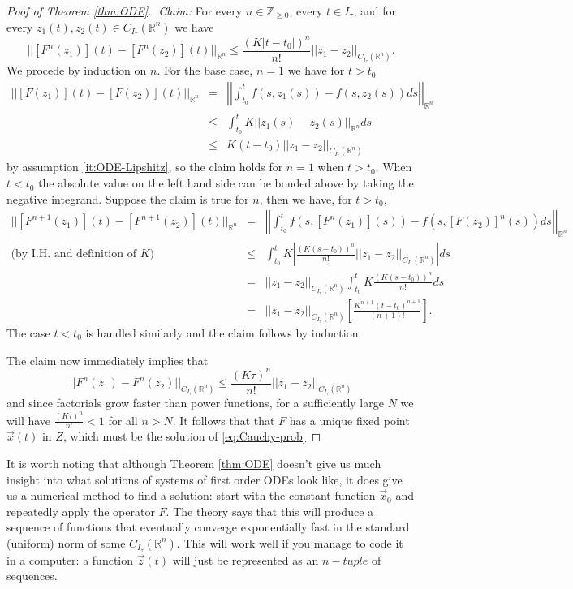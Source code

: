 \documentclass[10pt]{article}
\theoremstyle{definition}
\theoremstyle{remark}
\newcommand{\bbZ}{\mathbb{Z}}
\newcommand{\bbR}{\mathbb{R}}
\begin{document}
\begin{proof}[Poof of Theorem \ref{thm:ODE}.]
  \emph{Claim:} For every $n \in \bbZ_{\geq 0}$, every $t \in I_{\tau}$, and for every $z_1(t),z_2(t) \in C_{I_\tau}(\bbR^n)$ we have\[
    ||[F^n(z_1)](t) - [F^n(z_2)](t)||_{\bbR^n} \leq \frac{(K|t-t_0|)^n}{n!}||z_1-z_2||_{C_{I_\tau}(\bbR^n)}.
  \]
  We procede by induction on $n$. For the base case, $n=1$ we have for $t>t_0$
  \begin{eqnarray*}
    ||[F(z_1)](t) - [F(z_2)](t)||_{\bbR^n}
    &=& \left|\left|\int_{t_0}^tf(s,z_1(s))-f(s,z_2(s))ds \right|\right|_{\bbR^n}\\
    &\leq& \int_{t_0}^t K||z_1(s)-z_2(s)||_{\bbR^n} ds\\
    &\leq& K(t-t_0) ||z_1-z_2||_{C_{I_\tau}(\bbR^n)}
  \end{eqnarray*}
 by assumption \ref{it:ODE-Lipshitz}, so the claim holds for $n=1$ when $t>t_0$. When $t<t_0$ the absolute value on the left hand side can be bouded above by taking the negative integrand. Suppose the claim is true for $n$, then we have, for $t> t_0$,
\begin{eqnarray*}
  ||[F^{n+1}(z_1)](t) - [F^{n+1}(z_2)](t)||_{\bbR^n}
  & = & \left|\left|\int_{t_0}^tf(s,[F^n(z_1)](s))-f(s,[F(z_2)]^n(s))ds \right|\right|_{\bbR^n}\\
  \textrm{(by I.H. and definition of $K$)}& \leq & \int_{t_0}^t K\left|\frac{(K(s-t_0))^n}{n!}||z_1-z_2||_{C_{I_\tau}(\bbR^n)}\right|ds\\
  & = & ||z_1-z_2||_{C_{I_\tau}(\bbR^n)}\int_{t_0}^t K \frac{(K(s-t_0))^n}{n!}ds\\
  & = & ||z_1-z_2||_{C_{I_\tau}(\bbR^n)}\left[\frac{K^{n+1}(t-t_0)^{n+1}}{(n+1)!}\right].  
\end{eqnarray*}
The case $t<t_0$ is handled similarly and the claim follows by induction.

The claim now immediately implies that\[
  ||F^n(z_1) - F^n(z_2)||_{{C_{I_\tau}(\bbR^n)}} \leq \frac {(K\tau)^n}{n!}||z_1-z_2||_{C_{I_\tau}(\bbR^n)}
\] and since factorials grow faster than power functions, for a sufficiently large $N$ we will have $\frac {(K\tau)^n}{n!}<1$ for all $n>N$. It follows that that $F$ has a unique fixed point $\vec x(t)$ in $Z$, which must be the solution  of \eqref{eq:Cauchy-prob}
\end{proof}

It is worth noting that although Theorem \ref{thm:ODE} doesn't give us much insight into what solutions of systems of first order ODEs look like, it does give us a numerical method to find a solution: start with the constant function $\vec x_0$ and repeatedly apply the operator $F$. The theory says that this will produce a sequence of functions that eventually converge exponentially fast in the standard (uniform) norm of some $C_{I_\tau}(\bbR^n)$. This will work well if you manage to code it in a computer: a function $\vec z(t)$ will just be represented as an $n-tuple$ of sequences.
\end{document}
